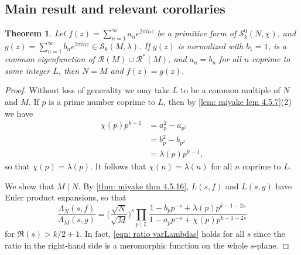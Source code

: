 \documentclass[10pt,leqno,twoside]{article}
\theoremstyle{plain}
\newtheorem{theorem}[lem]{Theorem}
\theoremstyle{definition}
\numberwithin{equation}{section}
\numberwithin{lem}{section}
\begin{document}
\subsection{Main result and relevant corollaries}
\begin{theorem}\label{thm: sm1 miyake thm 4.6.19}
    Let $f(z) = \sum_{n=1}^\infty a_ne^{2\pi i nz}$ be a primitive form of $\mathcal S_k^0(N,\chi)$, and $g(z) = \sum_{n=1}^\infty b_ne^{2\pi i n z}\in \mathcal S_k(M,\lambda)$. If $g(z)$ is normalized with $b_1 = 1$, is a common eigenfunction of $\mathcal R(M)\cup \mathcal R^\ast(M)$, and $a_n = b_n$ for all $n$ coprime to some integer $L$, then $N = M$ and $f(z) = g(z)$.
\end{theorem}
\begin{proof}
    Without loss of generality we may take $L$ to be a common multiple of $N$ and $M$. If $p$ is a prime number coprime to $L$, then by \cref{lem: miyake lem 4.5.7}(2) we have
    \begin{align*}
        \chi(p)p^{k-1} &= a_p^2 - a_{p^2} \\
        &= b_p^2 - b_{p^2} \\
        &= \lambda(p)p^{k-1},
    \end{align*} so that $\chi(p) = \lambda(p)$. It follows that $\chi(n) = \lambda(n)$ for all $n$ coprime to $L$.

    We show that $M\mid N$. By \cref{thm: miyake thm 4.5.16}, $L(s,f)$ and $L(s,g)$ have Euler product expansions, so that
    \begin{equation}\label{eqn: ratio varLambdas}
        \frac{\varLambda_N(s,f)}{\varLambda_M(s,g)} = \bigg(\frac{\sqrt{N}}{\sqrt{M}}\bigg)^s\prod_{p\mid L}\frac{1-b_pp^{-s} + \lambda(p)p^{k-1-2s}}{1-a_pp^{-s} + \chi(p)p^{k-1-2s}}
    \end{equation} for $\Re(s)>k/2+1$. In fact, \cref{eqn: ratio varLambdas} holds for all $s$ since the ratio in the right-hand side is a meromorphic function on the whole $s$-plane.


\end{proof}
\end{document}
